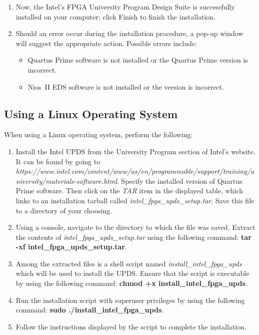 \documentclass[11pt, twoside, pdftex]{article}
\begin{document}
\begin{enumerate}
\item Now, the Intel's FPGA University Program Design Suite is successfully installed on your computer; click {\sf Finish} to
finish the installation.

\item Should an error occur during the installation procedure, a pop-up window will suggest the appropriate action. 
Possible errors include:
\begin{itemize}
\item Quartus Prime software is not installed or the Quartus Prime
version is incorrect.
\item Nios~II EDS software is not installed or the version is
incorrect.
\end{itemize}
\end{enumerate}


\subsection{Using a Linux Operating System}

When using a Linux operating system, perform the following:

\begin{enumerate} 
\item Install the Intel UPDS from the University Program section of Intel's website. It can be found by going to {\it https://www.intel.com/content/www/us/en/programmable/support/training/university/materials-software.html}.
Specify the installed version of Quartus Prime software.
Then click on the {\it TAR} item in the displayed table, 
which links to an installation tarball called 
{\it intel\_fpga\_upds\_setup.tar}. 
Save this file to a directory of your choosing.

\item Using a console, navigate to the directory to which the
file was saved. Extract the contents of 
{\it intel\_fpga\_upds\_setup.tar} using the following command: 
{\bf tar -xf intel\_fpga\_upds\_setup.tar}.

\item Among the extracted files is a shell script named
{\it install\_intel\_fpga\_upds} which will be used to install the
UPDS. Ensure that the script is executable by using the following
command: {\bf chmod +x install\_intel\_fpga\_upds}. 

\item Run the installation script with superuser privileges by
using the following command: 
{\bf sudo ./install\_intel\_fpga\_upds}.

\item Follow the instructions displayed by the script to complete
the installation.

\end{enumerate}
\end{document}

